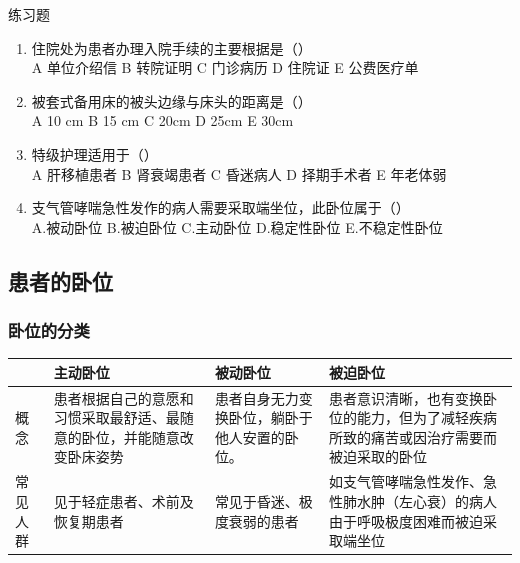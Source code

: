 \documentclass[11pt, a4paper]{ctexart}
\begin{document}
\begin{examplebox}{练习题}
	\begin{enumerate}
		\item 住院处为患者办理入院手续的主要根据是（\qquad）\\
		      A 单位介绍信 \quad B 转院证明 \quad C 门诊病历 \quad D 住院证 \quad E 公费医疗单
		\item 被套式备用床的被头边缘与床头的距离是（\qquad）\\
		      A 10 cm \quad B 15 cm \quad C 20cm \quad D 25cm \quad E 30cm
		\item 特级护理适用于（\qquad）\\
		      A 肝移植患者 \quad B 肾衰竭患者 \quad C 昏迷病人 \quad D 择期手术者 \quad E 年老体弱
		\item 支气管哮喘急性发作的病人需要采取端坐位，此卧位属于（\qquad）\\
		      A.被动卧位 \quad B.被迫卧位 \quad C.主动卧位 \quad D.稳定性卧位 \quad E.不稳定性卧位
	\end{enumerate}
\end{examplebox}

\subsection{患者的卧位}
\subsubsection{卧位的分类}
\begin{table}[htbp]
	\centering
	\begin{tabular}{|p{2.5cm}|p{4cm}|p{4cm}|p{4cm}|}
		\hline
		     & \textbf{主动卧位}                       & \textbf{被动卧位}          & \textbf{被迫卧位}                               \\
		\hline
		概念   & 患者根据自己的意愿和习惯采取最舒适、最随意的卧位，并能随意改变卧床姿势 & 患者自身无力变换卧位，躺卧于他人安置的卧位。 & 患者意识清晰，也有变换卧位的能力，但为了减轻疾病所致的痛苦或因治疗需要而被迫采取的卧位 \\
		\hline
		常见人群 & 见于轻症患者、术前及恢复期患者                     & 常见于昏迷、极度衰弱的患者          & 如支气管哮喘急性发作、急性肺水肿（左心衰）的病人由于呼吸极度困难而被迫采取端坐位    \\
		\hline
	\end{tabular}
\end{table}
\end{document}
